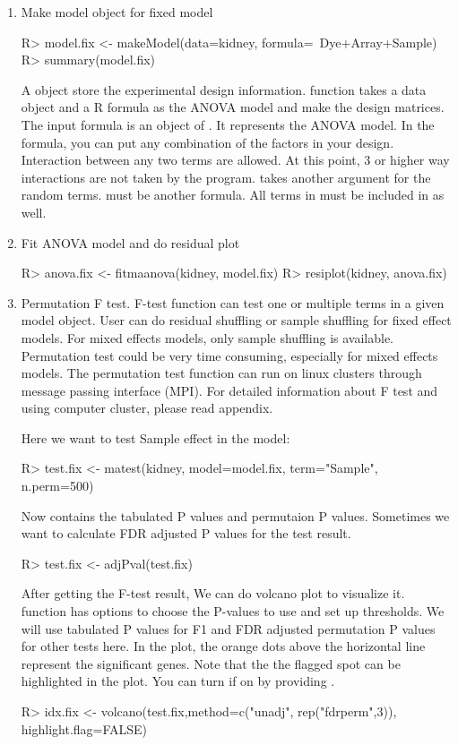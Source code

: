 \begin{enumerate}
\item Make model object for fixed model
\begin{Sinput}
R> model.fix <- makeModel(data=kidney, formula=~Dye+Array+Sample)
R> summary(model.fix)
\end{Sinput}

A  object store the experimental design information. 
 function takes a data object and a R formula as
the ANOVA model and make the design matrices. The input formula is an object
of . It represents
the ANOVA model. In the formula, you can put any combination of the factors
in your design. Interaction between any two terms are allowed. At this 
point, 3 or higher way interactions are not taken by the program. 
 takes another argument 
 for the random terms.
 must be another formula. 
All terms in  must
be included in  as well. 

\item Fit ANOVA model and do residual plot
\begin{Sinput}
R> anova.fix <- fitmaanova(kidney, model.fix)
R> resiplot(kidney, anova.fix)
\end{Sinput}

\item Permutation F test. F-test function can test one or multiple
terms in a given model object. User can do residual shuffling or
sample shuffling for fixed effect models. For mixed effects models,
only sample shuffling is available. Permutation test could be very
time consuming, especially for mixed effects models. The permutation
test function can run on linux clusters through message passing 
interface (MPI). For detailed information about F test and 
using computer cluster, please read appendix. 

Here we want to test Sample effect in the model:
\begin{Sinput}
R> test.fix <- matest(kidney, model=model.fix, term="Sample", 
       n.perm=500)
\end{Sinput}

Now  contains the tabulated P values and permutaion
P values. Sometimes we want to calculate FDR adjusted P values 
for the test result.
\begin{Sinput}
R> test.fix <- adjPval(test.fix)
\end{Sinput}

After getting the F-test result, We can do volcano plot
to visualize it.  function has options to 
choose the P-values to use and set up thresholds. We will
use tabulated P values for F1 and FDR adjusted permutation 
P values for other tests here. 
In the plot, the orange dots above the horizontal line represent
the significant genes. 
Note that the the flagged spot can be highlighted in the plot. 
You can turn if on by providing .
\begin{Sinput}
R> idx.fix <- volcano(test.fix,method=c("unadj", rep("fdrperm",3)),
         highlight.flag=FALSE)
\end{Sinput}


\end{enumerate}

